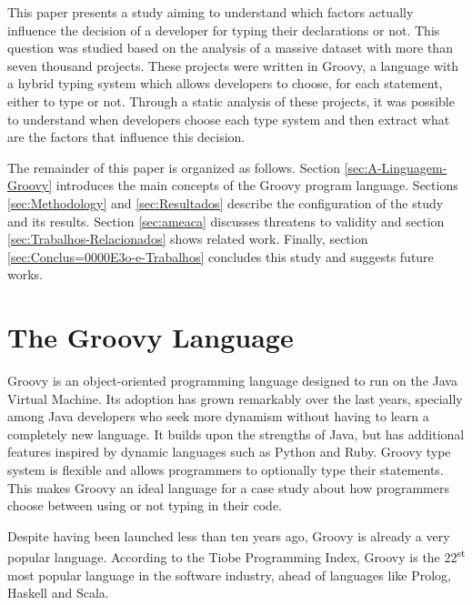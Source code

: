 \documentclass[preprint]{sigplanconf}
\begin{document}
This paper presents a study aiming to understand which factors actually influence the decision of a developer for typing their declarations or not. 
This question was studied based on the analysis of a massive dataset with more than seven thousand projects.
These projects were written in Groovy, a language with a hybrid typing system which allows developers to choose, for each statement, either to type or not.
Through a static analysis of these projects, it was possible to understand when developers choose each type system and then extract what are the factors that influence this decision.

The remainder of this paper is organized as follows. 
Section \ref{sec:A-Linguagem-Groovy} introduces the main concepts of the Groovy program language. 
Sections \ref{sec:Methodology} and \ref{sec:Resultados} describe the configuration of the study and its results. 
Section \ref{sec:ameaca} discusses threatens to validity and section \ref{sec:Trabalhos-Relacionados} shows related work. 
Finally, section  \ref{sec:Conclus=0000E3o-e-Trabalhos} concludes this study and suggests future works.














%
%

\section{The Groovy Language\label{sec:A-Linguagem-Groovy}}
Groovy is an object-oriented programming language designed to run on the Java Virtual Machine. Its adoption has grown remarkably over the last years, specially among Java developers who seek more dynamism without having to learn a completely new language.
It builds upon the strengths of Java, but has additional features inspired by dynamic languages such as Python and Ruby.
Groovy type system is flexible and allows programmers to optionally type their statements.
This makes Groovy an ideal language for a case study about how programmers choose between using or not typing in their code.

Despite having been launched less than ten years ago, Groovy is already a very popular language.
According to the Tiobe Programming Index, Groovy is the 22\textsuperscript{st} most popular language in the software industry\cite{tiobe}, ahead of languages like Prolog, Haskell and Scala. 
\end{document}
